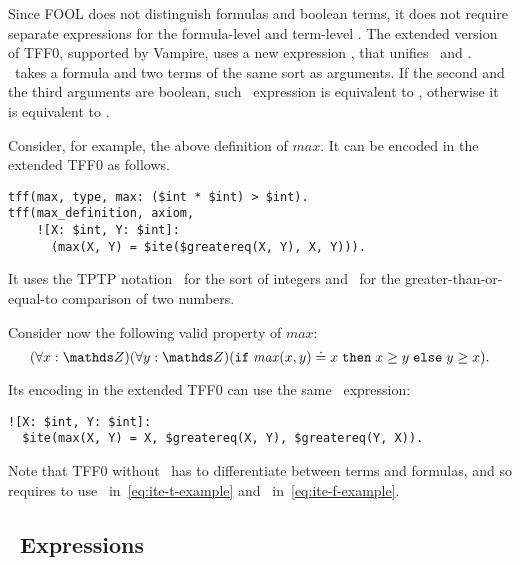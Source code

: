 Since FOOL does not distinguish formulas and boolean terms, it does not require separate expressions for the formula-level and term-level \ITE. The extended version of TFF0, supported by Vampire, uses a new expression \dite, that unifies \ditet\ and \ditef. \dite\ takes a formula and two terms of the same sort as arguments. If the second and the third arguments are boolean, such \dite\  expression is equivalent to \ditef, otherwise it is equivalent to \ditet.

Consider, for example, the above definition of $\mathit{max}$. It can be encoded in the extended TFF0 as follows.
\begin{lstlisting}[language=tptp]
tff(max, type, max: ($int * $int) > $int).
tff(max_definition, axiom,
    ![X: $int, Y: $int]:
      (max(X, Y) = $ite($greatereq(X, Y), X, Y))).
\end{lstlisting}%
It uses the TPTP notation \dint\ for the sort of integers and \dgreatereq\ for the greater-than-or-equal-to comparison of two numbers.


Consider now the following valid property of $\mathit{max}$:
\begin{equation}\label{eq:ite-f-example}
  (\forall x:\Z)(\forall y:\Z)(\ite{\mathit{max}(x, y) \eql x}{x \geq y}{y \geq x}).
\end{equation}

Its encoding in the extended TFF0 can use the same \dite\ expression:
\begin{lstlisting}[language=tptp]
![X: $int, Y: $int]:
  $ite(max(X, Y) = X, $greatereq(X, Y), $greatereq(Y, X)).
\end{lstlisting}%

Note that TFF0 without \dite\ has to differentiate between terms and formulas, and so requires to use \ditet\ in~\eqref{eq:ite-t-example} and \ditef\ in~\eqref{eq:ite-f-example}.

\subsection{\LETIN\ Expressions}

